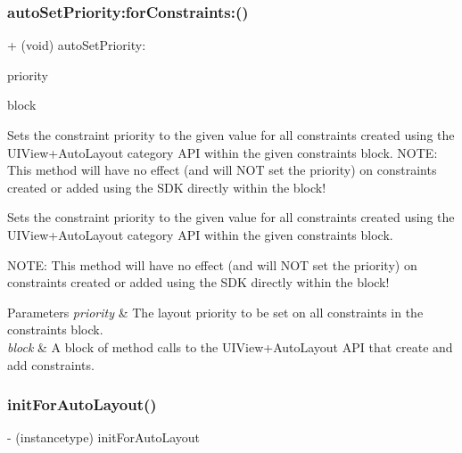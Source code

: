 \subsubsection{\texorpdfstring{auto\+Set\+Priority\+:for\+Constraints\+:()}{autoSetPriority:forConstraints:()}}
{\footnotesize\ttfamily + (void) auto\+Set\+Priority\+: \begin{DoxyParamCaption}\item[{(U\+I\+Layout\+Priority)}]{priority }\item[{forConstraints:(A\+L\+Constraints\+Block)}]{block }\end{DoxyParamCaption}}

Sets the constraint priority to the given value for all constraints created using the U\+I\+View+\+Auto\+Layout category A\+PI within the given constraints block. N\+O\+TE\+: This method will have no effect (and will N\+OT set the priority) on constraints created or added using the S\+DK directly within the block!

Sets the constraint priority to the given value for all constraints created using the U\+I\+View+\+Auto\+Layout category A\+PI within the given constraints block.

N\+O\+TE\+: This method will have no effect (and will N\+OT set the priority) on constraints created or added using the S\+DK directly within the block!


\begin{DoxyParams}{Parameters}
{\em priority} & The layout priority to be set on all constraints in the constraints block. \\
\hline
{\em block} & A block of method calls to the U\+I\+View+\+Auto\+Layout A\+PI that create and add constraints. \\
\hline
\end{DoxyParams}
\mbox{\label{category_u_i_view_07_auto_layout_08_a84269e054fbe2d33e63618980f1a85ee}} 
\subsubsection{\texorpdfstring{init\+For\+Auto\+Layout()}{initForAutoLayout()}}
{\footnotesize\ttfamily -\/ (instancetype) init\+For\+Auto\+Layout \begin{DoxyParamCaption}{ }\end{DoxyParamCaption}}

